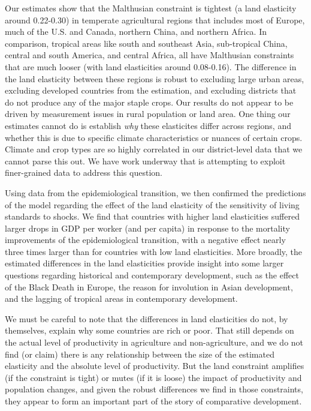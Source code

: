 \documentclass[11pt]{article}
\begin{document}
Our estimates show that the Malthusian constraint is tightest (a land elasticity around 0.22-0.30) in temperate agricultural regions that includes most of Europe, much of the U.S. and Canada, northern China, and northern Africa. In comparison, tropical areas like south and southeast Asia, sub-tropical China, central and south America, and central Africa, all have Malthusian constraints that are much looser (with land elasticities around 0.08-0.16). The difference in the land elasticity between these regions is robust to excluding large urban areas, excluding developed countries from the estimation, and excluding districts that do not produce any of the major staple crops. Our results do not appear to be driven by measurement issues in rural population or land area. One thing our estimates cannot do is establish \textit{why} these elasticites differ across regions, and whether this is due to specific climate characteristics or nuances of certain crops. Climate and crop types are so highly correlated in our district-level data that we cannot parse this out. We have work underway that is attempting to exploit finer-grained data to address this question.

Using data from the epidemiological transition, we then confirmed the predictions of the model regarding the effect of the land elasticity of the sensitivity of living standards to shocks. We find that countries with higher land elasticities suffered larger drops in GDP per worker (and per capita) in response to the mortality improvements of the epidemiological transition, with a negative effect nearly three times larger than for countries with low land elasticities. More broadly, the estimated differences in the land elasticities provide insight into some larger questions regarding historical and contemporary development, such as the effect of the Black Death in Europe, the reason for involution in Asian development, and the lagging of tropical areas in contemporary development. 

We must be careful to note that the differences in land elasticities do not, by themselves, explain why some countries are rich or poor. That still depends on the actual level of productivity in agriculture and non-agriculture, and we do not find (or claim) there is any relationship between the size of the estimated elasticity and the absolute level of productivity. But the land constraint amplifies (if the constraint is tight) or mutes (if it is loose) the impact of productivity and population changes, and given the robust differences we find in those constraints, they appear to form an important part of the story of comparative development.
\end{document}
